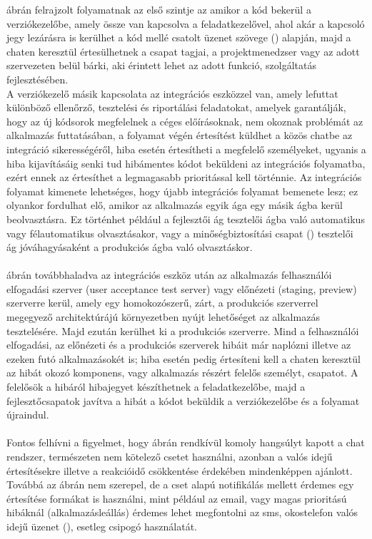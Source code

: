  ábrán felrajzolt folyamatnak az első szintje az amikor a kód bekerül a verziókezelőbe, amely össze van kapcsolva a feladatkezelővel, ahol akár a kapcsoló jegy lezárásra is kerülhet a kód mellé csatolt üzenet szövege () alapján, majd a chaten keresztül értesülhetnek a csapat tagjai, a projektmenedzser vagy az adott szervezeten belül bárki, aki érintett lehet az adott funkció, szolgáltatás fejlesztésében.\\
A verziókezelő másik kapcsolata az integrációs eszközzel van, amely lefuttat különböző ellenőrző, tesztelési és riportálási feladatokat, amelyek garantálják, hogy az új kódsorok megfelelnek a céges előírásoknak, nem okoznak problémát az alkalmazás futtatásában, a folyamat végén értesítést küldhet a közös chatbe az integráció sikerességéről, hiba esetén értesítheti a megfelelő személyeket, ugyanis a hiba kijavításáig senki tud hibámentes kódot beküldeni az integrációs folyamatba, ezért ennek az értesíthet a legmagasabb prioritással kell történnie. Az integrációs folyamat kimenete lehetséges, hogy újabb integrációs folyamat bemenete lesz; ez olyankor fordulhat elő, amikor az alkalmazás egyik ága egy másik ágba kerül beolvasztásra. Ez történhet például a fejlesztői ág tesztelői ágba való automatikus vagy félautomatikus olvasztásakor, vagy a minőségbiztosítási csapat () tesztelői ág jóváhagyásaként a produkciós ágba való olvasztáskor.\\
\hfill\\
 ábrán továbbhaladva az integrációs eszköz után az alkalmazás felhasználói elfogadási szerver (user acceptance test server) vagy előnézeti (staging, preview) szerverre kerül, amely egy homokozószerű, zárt, a produkciós szerverrel megegyező architektúrájú környezetben nyújt lehetőséget az alkalmazás tesztelésére. Majd ezután kerülhet ki a produkciós szerverre. Mind a felhasználói elfogadási, az előnézeti és a produkciós szerverek hibáit már naplózni illetve az ezeken futó alkalmazásokét is; hiba esetén pedig értesíteni kell a chaten keresztül az hibát okozó komponens, vagy alkalmazás részért felelős személyt, csapatot. A felelősök a hibáról hibajegyet készíthetnek a feladatkezelőbe, majd a fejlesztőcsapatok javítva a hibát a kódot beküldik a verziókezelőbe és a folyamat újraindul.\\
\hfill\\
Fontos felhívni a figyelmet, hogy  ábrán rendkívül komoly hangsúlyt kapott a chat rendszer, természeten nem kötelező csetet használni, azonban a valós idejű értesítésekre illetve a reakcióidő csökkentése érdekében mindenképpen ajánlott. Továbbá az ábrán nem szerepel, de a cset alapú notifikálás mellett érdemes egy értesítése formákat is használni, mint például az email, vagy magas prioritású hibáknál (alkalmazásleállás) érdemes lehet megfontolni az sms, okostelefon valós idejű üzenet (), esetleg csipogó használatát.

